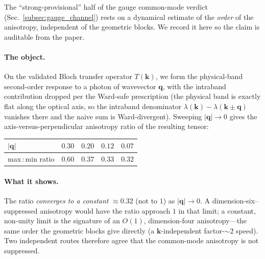 \label{sec:band_sum}

The ``strong-provisional'' half of the gauge common-mode verdict
(Sec.~\ref{subsec:gauge_channel}) rests on a dynamical estimate of the
\emph{order} of the anisotropy, independent of the geometric blocks. We record it
here so the claim is auditable from the paper.

\paragraph{The object.} On the validated Bloch transfer operator $T(\mathbf{k})$,
we form the physical-band second-order response to a photon of wavevector
$\mathbf{q}$, with the intraband contribution dropped per the Ward-safe
prescription (the physical band is exactly flat along the optical axis, so the
intraband denominator $\lambda(\mathbf{k})-\lambda(\mathbf{k}\pm\mathbf{q})$
vanishes there and the naive sum is Ward-divergent). Sweeping $|\mathbf{q}|\to0$
gives the axis-versus-perpendicular anisotropy ratio of the resulting tensor:

\begin{center}
\begin{tabular}{@{}lcccc@{}}
\hline
$|\mathbf{q}|$ & $0.30$ & $0.20$ & $0.12$ & $0.07$ \\
\hline
max\,:\,min ratio & $0.60$ & $0.37$ & $0.33$ & $0.32$ \\
\hline
\end{tabular}
\end{center}

\paragraph{What it shows.} The ratio \emph{converges to a constant} $\approx0.32$
(not to $1$) as $|\mathbf{q}|\to0$. A dimension-six--suppressed anisotropy would
have the ratio approach $1$ in that limit; a constant, non-unity limit is the
signature of an $O(1)$, dimension-four anisotropy---the same order the geometric
blocks give directly (a $\mathbf{k}$-independent factor-$\sim2$ speed). Two
independent routes therefore agree that the common-mode anisotropy is not
suppressed.

